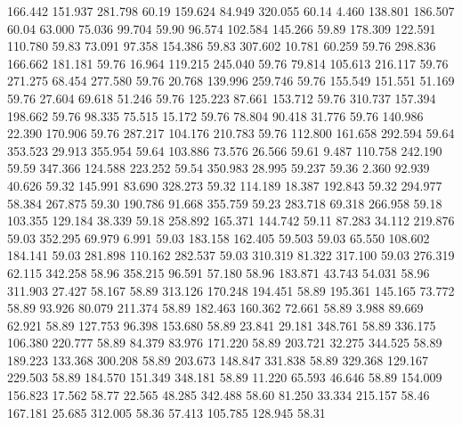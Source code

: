 166.442  151.937  281.798        60.19
 159.624   84.949  320.055        60.14
   4.460  138.801  186.507        60.04
  63.000   75.036   99.704        59.90
  96.574  102.584  145.266        59.89
 178.309  122.591  110.780        59.83
  73.091   97.358  154.386        59.83
 307.602   10.781   60.259        59.76
 298.836  166.662  181.181        59.76
  16.964  119.215  245.040        59.76
  79.814  105.613  216.117        59.76
 271.275   68.454  277.580        59.76
  20.768  139.996  259.746        59.76
 155.549  151.551   51.169        59.76
  27.604   69.618   51.246        59.76
 125.223   87.661  153.712        59.76
 310.737  157.394  198.662        59.76
  98.335   75.515   15.172        59.76
  78.804   90.418   31.776        59.76
 140.986   22.390  170.906        59.76
 287.217  104.176  210.783        59.76
 112.800  161.658  292.594        59.64
 353.523   29.913  355.954        59.64
 103.886   73.576   26.566        59.61
   9.487  110.758  242.190        59.59
 347.366  124.588  223.252        59.54
 350.983   28.995   59.237        59.36
   2.360   92.939   40.626        59.32
 145.991   83.690  328.273        59.32
 114.189   18.387  192.843        59.32
 294.977   58.384  267.875        59.30
 190.786   91.668  355.759        59.23
 283.718   69.318  266.958        59.18
 103.355  129.184   38.339        59.18
 258.892  165.371  144.742        59.11
  87.283   34.112  219.876        59.03
 352.295   69.979    6.991        59.03
 183.158  162.405   59.503        59.03
  65.550  108.602  184.141        59.03
 281.898  110.162  282.537        59.03
 310.319   81.322  317.100        59.03
 276.319   62.115  342.258        58.96
 358.215   96.591   57.180        58.96
 183.871   43.743   54.031        58.96
 311.903   27.427   58.167        58.89
 313.126  170.248  194.451        58.89
 195.361  145.165   73.772        58.89
  93.926   80.079  211.374        58.89
 182.463  160.362   72.661        58.89
   3.988   89.669   62.921        58.89
 127.753   96.398  153.680        58.89
  23.841   29.181  348.761        58.89
 336.175  106.380  220.777        58.89
  84.379   83.976  171.220        58.89
 203.721   32.275  344.525        58.89
 189.223  133.368  300.208        58.89
 203.673  148.847  331.838        58.89
 329.368  129.167  229.503        58.89
 184.570  151.349  348.181        58.89
  11.220   65.593   46.646        58.89
 154.009  156.823   17.562        58.77
  22.565   48.285  342.488        58.60
  81.250   33.334  215.157        58.46
 167.181   25.685  312.005        58.36
  57.413  105.785  128.945        58.31
